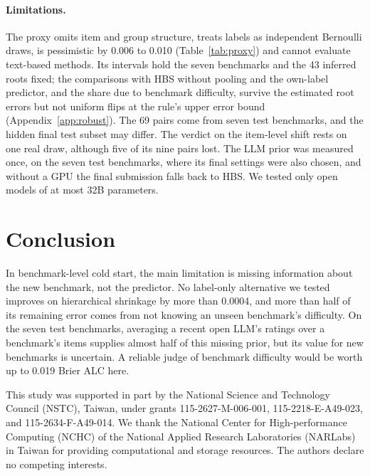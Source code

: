 \documentclass{article}
\begin{document}
\paragraph{Limitations.} The proxy omits item and group structure, treats labels as independent Bernoulli draws, is pessimistic by 0.006 to 0.010 (Table~\ref{tab:proxy}) and cannot evaluate text-based methods. Its intervals hold the seven benchmarks and the 43 inferred roots fixed; the comparisons with HBS without pooling and the own-label predictor, and the share due to benchmark difficulty, survive the estimated root errors but not uniform flips at the rule's upper error bound (Appendix~\ref{app:robust}). The 69 pairs come from seven test benchmarks, and the hidden final test subset may differ. The verdict on the item-level shift rests on one real draw, although five of its nine pairs lost. The LLM prior was measured once, on the seven test benchmarks, where its final settings were also chosen, and without a GPU the final submission falls back to HBS. We tested only open models of at most 32B parameters.

\section{Conclusion}

In benchmark-level cold start, the main limitation is missing information about the new benchmark, not the predictor. No label-only alternative we tested improves on hierarchical shrinkage by more than 0.0004, and more than half of its remaining error comes from not knowing an unseen benchmark's difficulty. On the seven test benchmarks, averaging a recent open LLM's ratings over a benchmark's items supplies almost half of this missing prior, but its value for new benchmarks is uncertain. A reliable judge of benchmark difficulty would be worth up to 0.019 Brier ALC here.

\begin{ack}
This study was supported in part by the National Science and Technology Council (NSTC), Taiwan, under grants 115-2627-M-006-001, 115-2218-E-A49-023, and 115-2634-F-A49-014. We thank the National Center for High-performance Computing (NCHC) of the National Applied Research Laboratories (NARLabs) in Taiwan for providing computational and storage resources. The authors declare no competing interests.
\end{ack}



\end{document}

